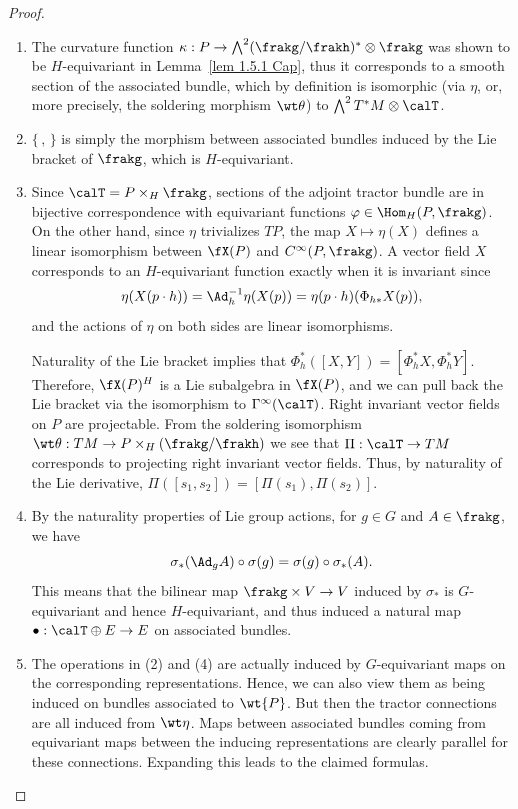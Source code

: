 \begin{proof}
    \begin{enumerate}[label=(\arabic*)]
        \item The curvature function $\kappa:P\to \bigwedge^2(\frakg\slash\frakh)^\ast\otimes\frakg$ was shown to be $H$-equivariant in Lemma~\ref{lem 1.5.1 Cap}, thus it corresponds to a smooth section of the associated bundle, which by definition is isomorphic (via $\eta$, or, more precisely, the soldering morphism $\wt\theta$) to $\bigwedge^2T^\ast M\otimes\calT$.
        \item $\{\,,\,\}$ is simply the morphism between associated bundles induced by the Lie bracket of $\frakg$, which is $H$-equivariant.
        \item Since $\calT=P\times_H\frakg$, sections of the adjoint tractor bundle are in bijective correspondence with equivariant functions $\varphi\in\Hom_H(P,\frakg)$. On the other hand, since $\eta$ trivializes $TP$, the map $X\mapsto \eta(X)$ defines a linear isomorphism between $\fX(P)$ and $C^\infty(P,\frakg)$. A vector field $X$ corresponds to an $H$-equivariant function exactly when it is invariant since
        \[\eta(X(p\cdot h))=\Ad_h^{-1}\eta(X(p))=\eta(p\cdot h)(\Phi_{h\ast}X(p)),\]
        and the actions of $\eta$ on both sides are linear isomorphisms.

        Naturality of the Lie bracket implies that $\Phi_h^\ast([X,Y])=[\Phi_h^\ast X,\Phi_h^\ast Y]$. Therefore, $\fX(P)^H$ is a Lie subalgebra in $\fX(P)$, and we can pull back the Lie bracket via the isomorphism to $\Gamma^\infty(\calT)$. Right invariant vector fields on $P$ are projectable. From the soldering isomorphism $\wt\theta:TM\to P\times_H (\frakg\slash\frakh)$ we see that $\Pi:\calT\to TM$ corresponds to projecting right invariant vector fields. Thus, by naturality of the Lie derivative, $\Pi([s_1,s_2])=[\Pi(s_1),\Pi(s_2)]$.
        \item By the naturality properties of Lie group actions, for $g\in G$ and $A\in\frakg$, we have
        \[\sigma_\ast(\Ad_g A)\circ \sigma(g)=\sigma(g)\circ \sigma_\ast(A).\]
        This means that the bilinear map $\frakg\times V\to V$ induced by $\sigma_\ast$ is $G$-equivariant and hence $H$-equivariant, and thus induced a natural map $\bullet:\calT\oplus E\to E$ on associated bundles.
        \item The operations in (2) and (4) are actually induced by $G$-equivariant maps on the corresponding representations. Hence, we can also view them as being induced on bundles associated to $\wt{P}$. But then the tractor connections are all induced from $\wt\eta$. Maps between associated bundles coming from equivariant maps between the inducing representations are clearly parallel for these connections. Expanding this leads to the claimed formulas.
    \end{enumerate}
\end{proof}


